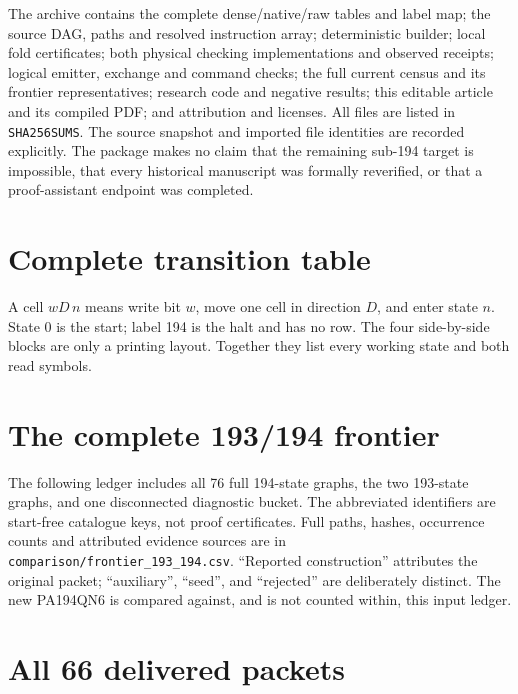 \documentclass[11pt,letterpaper]{article}
\newcommand{\file}[1]{\texttt{\nolinkurl{#1}}}
\begin{document}
The archive contains the complete dense/native/raw tables and label map;
the source DAG, paths and resolved instruction array; deterministic builder;
local fold certificates; both physical checking implementations and observed
receipts; logical emitter, exchange and command checks; the full current
census and its frontier representatives; research code and negative results;
this editable article and its compiled PDF; and attribution and licenses.
All files are listed in \file{SHA256SUMS}. The source snapshot and imported
file identities are recorded explicitly. The package makes no claim that
the remaining sub-194 target is impossible, that every historical manuscript
was formally reverified, or that a proof-assistant endpoint was completed.

\clearpage
\appendix
\section{Complete transition table}
\label{app:machine}

A cell $wD\,n$ means write bit $w$, move one cell in direction $D$, and
enter state $n$. State 0 is the start; label 194 is the halt and has no row.
The four side-by-side blocks are only a printing layout. Together they
list every working state and both read symbols.
\begin{center}\footnotesize

\end{center}

\clearpage
\section{The complete 193/194 frontier}
\label{app:frontier}

The following ledger includes all 76 full 194-state graphs, the two 193-state
graphs, and one disconnected diagnostic bucket. The abbreviated identifiers
are start-free catalogue keys, not proof certificates. Full paths, hashes,
occurrence counts and attributed evidence sources are in
\file{comparison/frontier_193_194.csv}. ``Reported construction'' attributes
the original packet; ``auxiliary'', ``seed'', and ``rejected'' are deliberately
distinct. The new PA194QN6 is compared against, and is not counted within,
this input ledger.
{\small}

\clearpage
\section{All 66 delivered packets}
\label{app:packets}
\end{document}

